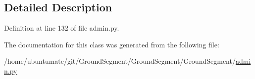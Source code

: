\subsection{Detailed Description}


Definition at line 132 of file admin.\+py.



The documentation for this class was generated from the following file\+:\begin{DoxyCompactItemize}
\item 
/home/ubuntumate/git/\+Ground\+Segment/\+Ground\+Segment/\+Ground\+Segment/\hyperlink{admin_8py}{admin.\+py}\end{DoxyCompactItemize}
